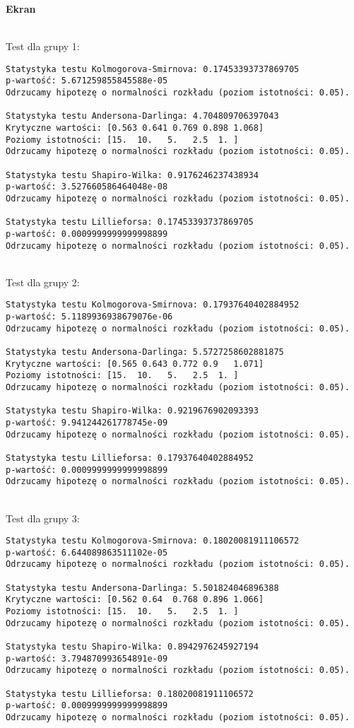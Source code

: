 \documentclass[12pt,a4paper]{article}
\begin{document}
\newpage
\begin{center}
    \textbf{Ekran}
\end{center}
\\
Test dla grupy 1:
\begin{lstlisting}
Statystyka testu Kolmogorova-Smirnova: 0.17453393737869705
p-wartość: 5.671259855845588e-05 
Odrzucamy hipotezę o normalności rozkładu (poziom istotności: 0.05).

Statystyka testu Andersona-Darlinga: 4.704809706397043
Krytyczne wartości: [0.563 0.641 0.769 0.898 1.068]
Poziomy istotności: [15.  10.   5.   2.5  1. ]
Odrzucamy hipotezę o normalności rozkładu (poziom istotności: 0.05).

Statystyka testu Shapiro-Wilka: 0.9176246237438934
p-wartość: 3.527660586464048e-08
Odrzucamy hipotezę o normalności rozkładu (poziom istotności: 0.05).

Statystyka testu Lillieforsa: 0.17453393737869705
p-wartość: 0.0009999999999998899
Odrzucamy hipotezę o normalności rozkładu (poziom istotności: 0.05).
\end{lstlisting}
\\
Test dla grupy 2:
\begin{lstlisting}
Statystyka testu Kolmogorova-Smirnova: 0.17937640402884952
p-wartość: 5.1189936938679076e-06
Odrzucamy hipotezę o normalności rozkładu (poziom istotności: 0.05).

Statystyka testu Andersona-Darlinga: 5.5727258602881875
Krytyczne wartości: [0.565 0.643 0.772 0.9   1.071]
Poziomy istotności: [15.  10.   5.   2.5  1. ]
Odrzucamy hipotezę o normalności rozkładu (poziom istotności: 0.05).

Statystyka testu Shapiro-Wilka: 0.9219676902093393
p-wartość: 9.941244261778745e-09
Odrzucamy hipotezę o normalności rozkładu (poziom istotności: 0.05).

Statystyka testu Lillieforsa: 0.17937640402884952
p-wartość: 0.0009999999999998899
Odrzucamy hipotezę o normalności rozkładu (poziom istotności: 0.05).
\end{lstlisting}
\\
Test dla grupy 3:
\begin{lstlisting}
Statystyka testu Kolmogorova-Smirnova: 0.18020081911106572
p-wartość: 6.644089863511102e-05
Odrzucamy hipotezę o normalności rozkładu (poziom istotności: 0.05).

Statystyka testu Andersona-Darlinga: 5.501824046896388
Krytyczne wartości: [0.562 0.64  0.768 0.896 1.066]
Poziomy istotności: [15.  10.   5.   2.5  1. ] 
Odrzucamy hipotezę o normalności rozkładu (poziom istotności: 0.05).

Statystyka testu Shapiro-Wilka: 0.8942976245927194
p-wartość: 3.794870993654891e-09
Odrzucamy hipotezę o normalności rozkładu (poziom istotności: 0.05).

Statystyka testu Lillieforsa: 0.18020081911106572
p-wartość: 0.0009999999999998899
Odrzucamy hipotezę o normalności rozkładu (poziom istotności: 0.05).
\end{lstlisting}
\end{document}
